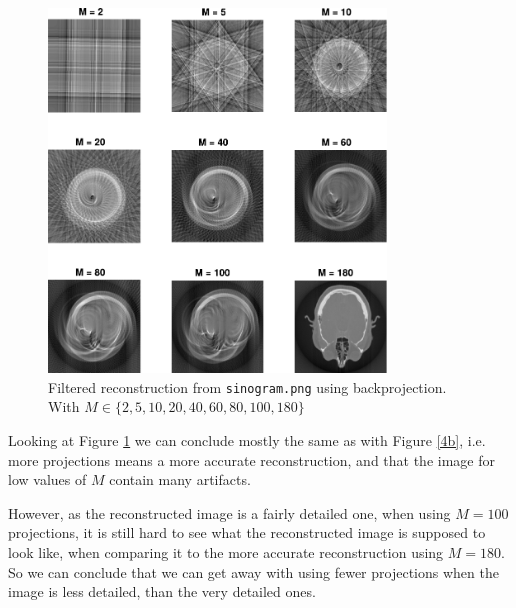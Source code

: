 \documentclass[a4paper]{article}
\begin{document}
\begin{figure}[H]
  \centering
  \includegraphics[width=0.8\textwidth]{./4c.pdf}
  \caption{Filtered reconstruction from \texttt{sinogram.png} using backprojection. With $M \in \{2,5,10,20,40,60,80,100,180\}$}
  \label{4c}
\end{figure}
Looking at Figure \ref{4c} we can conclude mostly the same as with Figure \ref{4b}, i.e. more projections means a more accurate reconstruction, and that the image for low values of $M$ contain many artifacts.

However, as the reconstructed image is a fairly detailed one, when using $M=100$ projections, it is still hard to see what the reconstructed image is supposed to look like, when comparing it to the more accurate reconstruction using $M=180$. So we can conclude that we can get away with using fewer projections when the image is less detailed, than the very detailed ones.
\end{document}

